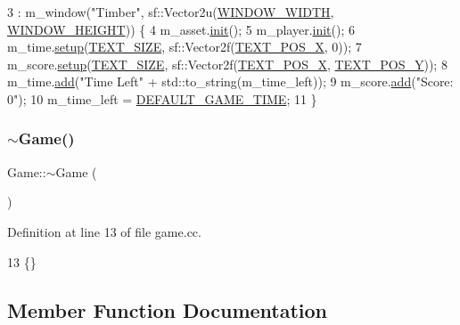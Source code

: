 \begin{DoxyCode}
3            : m\_window(\textcolor{stringliteral}{"Timber"}, sf::Vector2u(\hyperlink{game_8h_a498d9f026138406895e9a34b504ac6a6}{WINDOW\_WIDTH}, 
      \hyperlink{game_8h_a5473cf64fa979b48335079c99532e243}{WINDOW\_HEIGHT})) \{
4     m\_asset.\hyperlink{class_assets_a1e07c9e1ddf47daf66001d887df95c7b}{init}();
5     m\_player.\hyperlink{class_player_a015ea21fa1e7273e47d48cb20d9b12e3}{init}();
6     m\_time.\hyperlink{class_text_afde89d05e0de0f17092b8c56e6ac77df}{setup}(\hyperlink{game_8h_afb6f36d91ffbf947cfa3f1114ca79764}{TEXT\_SIZE}, sf::Vector2f(\hyperlink{game_8h_ace9b596635b2d198b6a0e4a2c089ef0e}{TEXT\_POS\_X}, 0));
7     m\_score.\hyperlink{class_text_afde89d05e0de0f17092b8c56e6ac77df}{setup}(\hyperlink{game_8h_afb6f36d91ffbf947cfa3f1114ca79764}{TEXT\_SIZE}, sf::Vector2f(\hyperlink{game_8h_ace9b596635b2d198b6a0e4a2c089ef0e}{TEXT\_POS\_X}, 
      \hyperlink{game_8h_ac8da78c67c5d1d72f3136006a0e4d856}{TEXT\_POS\_Y}));
8     m\_time.\hyperlink{class_text_ab5f6fabb3e5e029ed0e42d21757c9521}{add}(\textcolor{stringliteral}{"Time Left"} + std::to\_string(m\_time\_left));
9     m\_score.\hyperlink{class_text_ab5f6fabb3e5e029ed0e42d21757c9521}{add}(\textcolor{stringliteral}{"Score: 0"});
10     m\_time\_left = \hyperlink{game_8h_a0edfb2481ef7bcfb3e2e942a936a98d9}{DEFAULT\_GAME\_TIME};
11 \}
\end{DoxyCode}
\mbox{\label{class_game_ae3d112ca6e0e55150d2fdbc704474530}} 
\subsubsection{\texorpdfstring{$\sim$\+Game()}{~Game()}}
{\footnotesize\ttfamily Game\+::$\sim$\+Game (\begin{DoxyParamCaption}{ }\end{DoxyParamCaption})}



Definition at line 13 of file game.\+cc.


\begin{DoxyCode}
13 \{\}
\end{DoxyCode}


\subsection{Member Function Documentation}
\mbox{\label{class_game_a4924f7fafddc76b267d1dc9138fa07d0}} 
